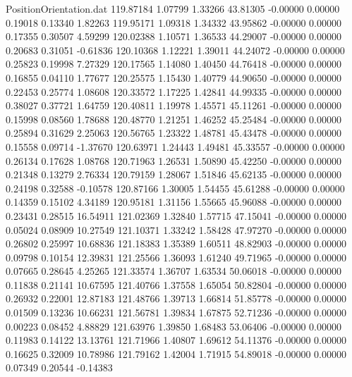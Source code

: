 \begin{filecontents}{PositionOrientation.dat}
 119.87184    1.07799    1.33266    43.81305   -0.00000    0.00000    0.19018    0.13340    1.82263
 119.95171    1.09318    1.34332    43.95862   -0.00000    0.00000    0.17355    0.30507    4.59299
 120.02388    1.10571    1.36533    44.29007   -0.00000    0.00000    0.20683    0.31051   -0.61836
 120.10368    1.12221    1.39011    44.24072   -0.00000    0.00000    0.25823    0.19998    7.27329
 120.17565    1.14080    1.40450    44.76418   -0.00000    0.00000    0.16855    0.04110    1.77677
 120.25575    1.15430    1.40779    44.90650   -0.00000    0.00000    0.22453    0.25774    1.08608
 120.33572    1.17225    1.42841    44.99335   -0.00000    0.00000    0.38027    0.37721    1.64759
 120.40811    1.19978    1.45571    45.11261   -0.00000    0.00000    0.15998    0.08560    1.78688
 120.48770    1.21251    1.46252    45.25484   -0.00000    0.00000    0.25894    0.31629    2.25063
 120.56765    1.23322    1.48781    45.43478   -0.00000    0.00000    0.15558    0.09714   -1.37670
 120.63971    1.24443    1.49481    45.33557   -0.00000    0.00000    0.26134    0.17628    1.08768
 120.71963    1.26531    1.50890    45.42250   -0.00000    0.00000    0.21348    0.13279    2.76334
 120.79159    1.28067    1.51846    45.62135   -0.00000    0.00000    0.24198    0.32588   -0.10578
 120.87166    1.30005    1.54455    45.61288   -0.00000    0.00000    0.14359    0.15102    4.34189
 120.95181    1.31156    1.55665    45.96088   -0.00000    0.00000    0.23431    0.28515   16.54911
 121.02369    1.32840    1.57715    47.15041   -0.00000    0.00000    0.05024    0.08909   10.27549
 121.10371    1.33242    1.58428    47.97270   -0.00000    0.00000    0.26802    0.25997   10.68836
 121.18383    1.35389    1.60511    48.82903   -0.00000    0.00000    0.09798    0.10154   12.39831
 121.25566    1.36093    1.61240    49.71965   -0.00000    0.00000    0.07665    0.28645    4.25265
 121.33574    1.36707    1.63534    50.06018   -0.00000    0.00000    0.11838    0.21141   10.67595
 121.40766    1.37558    1.65054    50.82804   -0.00000    0.00000    0.26932    0.22001   12.87183
 121.48766    1.39713    1.66814    51.85778   -0.00000    0.00000    0.01509    0.13236   10.66231
 121.56781    1.39834    1.67875    52.71236   -0.00000    0.00000    0.00223    0.08452    4.88829
 121.63976    1.39850    1.68483    53.06406   -0.00000    0.00000    0.11983    0.14122   13.13761
 121.71966    1.40807    1.69612    54.11376   -0.00000    0.00000    0.16625    0.32009   10.78986
 121.79162    1.42004    1.71915    54.89018   -0.00000    0.00000    0.07349    0.20544   -0.14383

\end{filecontents}
